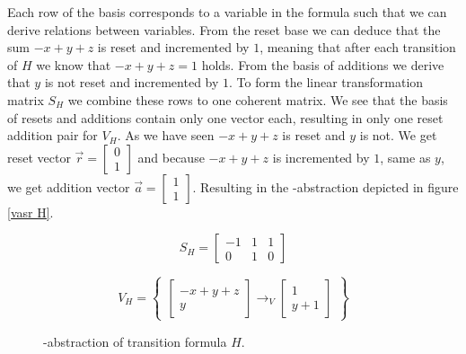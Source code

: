 Each row of the basis corresponds to a variable in the formula such that we can derive relations between variables. From the reset base we can deduce that the sum $-x + y + z$ is reset and incremented by $1$, meaning that after each transition of $H$ we know that $-x + y + z = 1$ holds. From the basis of additions we derive that $y$ is not reset and incremented by $1$. To form the linear transformation matrix $S_H$ we combine these rows to one coherent matrix. We see that the basis of resets and additions contain only one vector each, resulting in only one reset addition pair for $V_H$. As we have seen $-x + y + z$ is reset and $y$ is not. We get reset vector $\vec{r} = \begin{bmatrix} 0 \\ 1 \end{bmatrix}$ and because $-x + y + z$ is incremented by $1$, same as $y$, we get addition vector $\vec{a} = \begin{bmatrix} 1 \\ 1 \end{bmatrix}$. Resulting in the \qvasr-abstraction depicted in figure \ref{vasr  H}.
\vspace*{-2em}
\begin{figure}[H]
	\begin{center}
		\begin{minipage}{0.3\linewidth}
			\begin{equation*}
				S_H = \begin{bmatrix} -1 & 1 & 1 \\ 0 & 1 & 0 \end{bmatrix}
			\end{equation*}
		\end{minipage}
		\begin{minipage}{0.6\linewidth}
			\begin{equation*}
				V_H = \begin{Bmatrix} \begin{bmatrix} - x + y + z \\ y \end{bmatrix} \rightarrow_V \begin{bmatrix}	1 \\ y + 1 \end{bmatrix} \end{Bmatrix}
			\end{equation*}
		\end{minipage}
	\caption{\qvasr-abstraction of transition formula $H$.}
	\label{vasr H}
	\end{center}
\end{figure}
